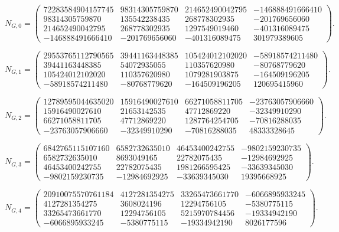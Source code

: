 \[
N_{G,0}=\begin{pmatrix}
72283584904157745 & 98314305759870 & 214652490042795 & -146888491666410\\
98314305759870 & 135542238435 & 268778302935 & -201769656060\\
214652490042795 & 268778302935 & 1297549019460 & -401316089475\\
-146888491666410 & -201769656060 & -401316089475 & 301979389605
\end{pmatrix}.
\]

\[
N_{G,1}=\begin{pmatrix}
29553765112790565 & 39441163448385 & 105424012102020 & -58918574211480\\
39441163448385 & 54072935055 & 110357620980 & -80768779620\\
105424012102020 & 110357620980 & 1079281903875 & -164509196205\\
-58918574211480 & -80768779620 & -164509196205 & 120695415960
\end{pmatrix}.
\]

\[
N_{G,2}=\begin{pmatrix}
12789595044635020 & 15916490027610 & 66271058811705 & -23763057906660\\
15916490027610 & 21653142535 & 47712869220 & -32349910290\\
66271058811705 & 47712869220 & 1287764254705 & -70816288035\\
-23763057906660 & -32349910290 & -70816288035 & 48333328645
\end{pmatrix}.
\]

\[
N_{G,3}=\begin{pmatrix}
6842765115107160 & 6582732635010 & 46453400242755 & -9802159230735\\
6582732635010 & 8693049165 & 22782075435 & -12984692925\\
46453400242755 & 22782075435 & 1981266595425 & -33639345030\\
-9802159230735 & -12984692925 & -33639345030 & 19395668925
\end{pmatrix}.
\]

\[
N_{G,4}=\begin{pmatrix}
20910075570761184 & 4127281354275 & 33265473661770 & -6066895933245\\
4127281354275 & 3608024196 & 12294756105 & -5380775115\\
33265473661770 & 12294756105 & 5215970784456 & -19334942190\\
-6066895933245 & -5380775115 & -19334942190 & 8026177596
\end{pmatrix}.
\]
